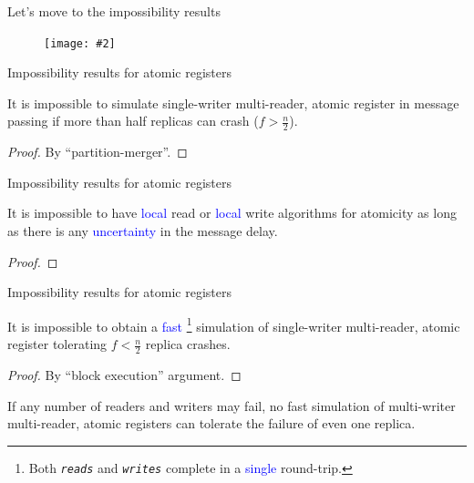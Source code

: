 \documentclass{beamer}
\makeatletter
\newcommand{\citeinbeamer}[3]{{\scriptsize{\textcolor{blue}{[#1@#2'#3]}}}}
\newcommand{\fignocaption}[2]
{
  \begin{figure}[htp]
    \centering
      \texttt{[image: \#2]}
  \end{figure}
}
\newcommand{\largeblue}[1]{\textcolor{blue}{\large #1}}
\makeatother
\begin{document}
\begin{frame}[label = impossibility-backup]{Let's move to the impossibility
results \hyperlink{impossibility-lowerbounds-main}{}}
  \fignocaption{width = 0.35\textwidth}{fig/escher-waterfall.jpg}
\end{frame}
\begin{frame}{Impossibility results for atomic registers}
  \begin{theorem}[\citeinbeamer{Attiya?}{Wiley}{04}]
  It is impossible to simulate single-writer multi-reader, atomic register in
  message passing if more than half replicas can crash ($f > \frac{n}{2}$).
  \end{theorem}

  \begin{proof}
    By ``partition-merger''.
  \end{proof}
\end{frame}
\begin{frame}{Impossibility results for atomic registers}
  \begin{theorem}[\citeinbeamer{Attiya}{TOCS}{94}]
    It is impossible to have \largeblue{local} read or \largeblue{local} write
    algorithms for atomicity as long as there is any \largeblue{uncertainty} in
    the message delay.
  \end{theorem}

  \begin{proof}

  \end{proof}
\end{frame}
\begin{frame}{Impossibility results for atomic registers}
  \begin{theorem}[\citeinbeamer{Dutta}{PODC}{04}]
    It is impossible to obtain a \largeblue{fast} \footnote[frame]{Both
    \texttt{\it reads} and \texttt{\it writes} complete in a \largeblue{single}
    round-trip.} simulation of single-writer multi-reader, atomic register
    tolerating $f < \frac{n}{2}$ replica crashes.
  \end{theorem}

  \begin{proof}
	By ``block execution'' argument.
  \end{proof}

  \vspace{0.50cm}
  \begin{theorem}[\citeinbeamer{Dutta}{PODC}{04}]
    If any number of readers and writers may fail, no fast simulation of
    multi-writer multi-reader, atomic registers can tolerate the failure of even
    one replica.
  \end{theorem}
\end{frame}
\end{document}
